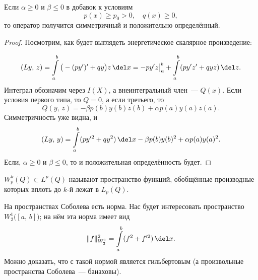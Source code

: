 \documentclass{trlnotes}
\begin{document}
    \begin{st}
        Если $\alpha \geqslant 0$ и $\beta \leqslant 0$ в добавок к условиям
        \[
            p(x) \geqslant p_0 > 0, \quad q(x) \geqslant 0,
        \]
        то оператор получится симметричный и положительно определённый.

        \begin{proof}
            Посмотрим, как будет выглядеть энергетическое скалярное произведение:

            \[
                (Ly, \, z) = \int\limits_a^b \big(-(py')' + qy\big) z \, \del x = -py'z\big|_a^b + \int\limits_a^b (py'z' + qyz) \, \del z.
            \]
            Интеграл обозначим через $I(X)$, а внеинтегральный член~--- $Q(x)$. Если условия первого типа, то $Q = 0$, а если третьего, то
            \[
                Q(y, \, z) = -\beta p(b)y(b)z(b) + \alpha p(a)y(a)z(a).
            \]
            Симметричность уже видна, и
            \[
                (Ly, \, y) = \int\limits_a^b (py'^2 + qy^2) \, \del x -\beta p(b)y(b)^2 + \alpha p(a)y(a)^2.
            \]
            Если, $\alpha \geqslant 0$ и $\beta \leqslant 0$, то и положительная определённость будет.
        \end{proof}
    \end{st}

    \begin{de}
         $W_p^k(Q) \subset L^p(Q)$ называют пространство функций, обобщённые производные которых вплоть до $k$-й лежат в $L_p(Q)$.
    \end{de}

    \begin{rem}
        На пространствах Соболева есть норма. Нас будет интересовать пространство $W_2^1\big([a, \, b]\big)$; на нём эта норма имеет вид
        \[
            \|f\|^2_{W_2^1} = \int\limits_a^b (f^2 + f'^2) \, \del x.
        \]
        Можно доказать, что с такой нормой является гильбертовым (а произвольные пространства Соболева~--- банаховы). 
    \end{rem}
\end{document}

